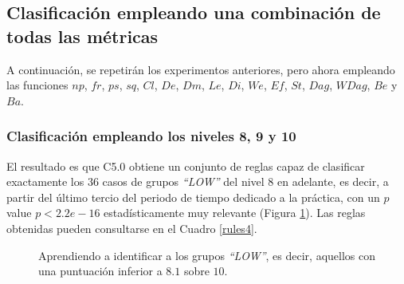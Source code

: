 \subsection{Clasificación empleando una combinación de todas las métricas}

A continuación, se repetirán los experimentos anteriores, pero ahora empleando las funciones $np$, $fr$, $ps$, $sq$, $Cl$, $De$, $Dm$, $Le$, $Di$, $We$, $Ef$, $St$, $Dag$, $WDag$, $Be$ y $Ba$.

\subsubsection{Clasificación empleando los niveles 8, 9 y 10}

El resultado es que C5.0 obtiene un conjunto de reglas capaz de clasificar exactamente los $36$ casos de grupos \emph{``LOW''} del nivel $8$ en adelante, es decir, a partir del último tercio del periodo de tiempo dedicado a la práctica, con un $p$ value $p < 2.2e-16$ estadísticamente muy relevante (Figura \ref{fig:cm4}). Las reglas obtenidas pueden consultarse en el Cuadro \ref{rules4}.

\begin{figure}[H]
\centering
{}
\caption{Aprendiendo a identificar a los grupos \emph{``LOW''}, es decir, aquellos con una puntuación inferior a $8.1$ sobre $10$.}
\label{fig:cm4}
\end{figure}

